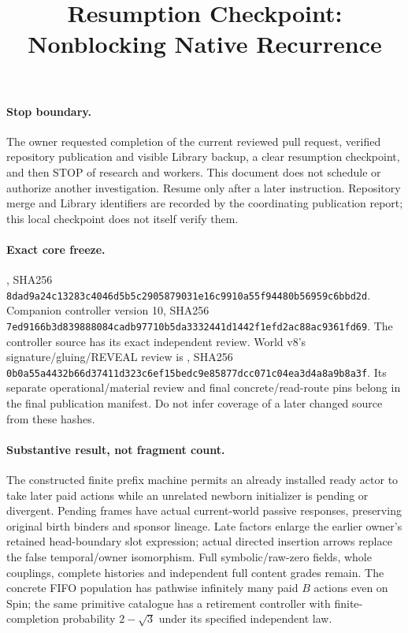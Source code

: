 \documentclass{article}\usepackage{amsmath,amssymb,url}
\title{Resumption Checkpoint: Nonblocking Native Recurrence}
\begin{document}
\maketitle
\paragraph{Stop boundary.} The owner requested completion of the current reviewed pull request, verified repository publication and visible Library backup, a clear resumption checkpoint, and then STOP of research and workers. This document does not schedule or authorize another investigation. Resume only after a later instruction. Repository merge and Library identifiers are recorded by the coordinating publication report; this local checkpoint does not itself verify them.

\paragraph{Exact core freeze.} , SHA256 \texttt{8dad9a24c13283c4046d5b5c2905879031e16c9910a55f94480b56959c6bbd2d}. Companion controller version 10, SHA256 \texttt{7ed9166b3d839888084cadb97710b5da3332441d1442f1efd2ac88ac9361fd69}. The controller source has its exact independent review. World v8's signature/gluing/REVEAL review is , SHA256 \texttt{0b0a55a4432b66d37411d323c6ef15bedc9e85877dcc071c04ea3d4a8a9b8a3f}. Its separate operational/material review and final concrete/read-route pins belong in the final publication manifest. Do not infer coverage of a later changed source from these hashes.

\paragraph{Substantive result, not fragment count.} The constructed finite prefix machine permits an already installed ready actor to take later paid actions while an unrelated newborn initializer is pending or divergent. Pending frames have actual current-world passive responses, preserving original birth binders and sponsor lineage. Late factors enlarge the earlier owner's retained head-boundary slot expression; actual directed insertion arrows replace the false temporal/owner isomorphism. Full symbolic/raw-zero fields, whole couplings, complete histories and independent full content grades remain. The concrete FIFO population has pathwise infinitely many paid $B$ actions even on Spin; the same primitive catalogue has a retirement controller with finite-completion probability $2-\sqrt3$ under its specified independent law.
\end{document}
